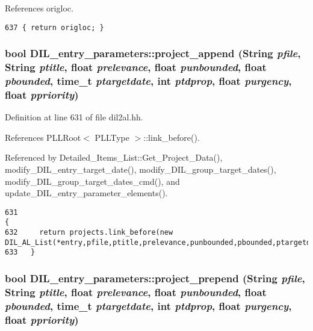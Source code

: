 References origloc.



\footnotesize\begin{verbatim}637 { return origloc; }
\end{verbatim}\normalsize 
{}
\subsubsection{\setlength{\rightskip}{0pt plus 5cm}bool DIL\_\-entry\_\-parameters::project\_\-append ({\bf String} {\em pfile}, {\bf String} {\em ptitle}, float {\em prelevance}, float {\em punbounded}, float {\em pbounded}, time\_\-t {\em ptargetdate}, int {\em ptdprop}, float {\em purgency}, float {\em ppriority})\hspace{0.3cm}{\tt  [inline]}}\label{classDIL__entry__parameters_a3}




Definition at line 631 of file dil2al.hh.

References PLLRoot$<$ PLLType $>$::link\_\-before().

Referenced by Detailed\_\-Items\_\-List::Get\_\-Project\_\-Data(), modify\_\-DIL\_\-entry\_\-target\_\-date(), modify\_\-DIL\_\-group\_\-target\_\-dates(), modify\_\-DIL\_\-group\_\-target\_\-dates\_\-cmd(), and update\_\-DIL\_\-entry\_\-parameter\_\-elements().



\footnotesize\begin{verbatim}631                                                                                                                                                                          {
632     return projects.link_before(new DIL_AL_List(*entry,pfile,ptitle,prelevance,punbounded,pbounded,ptargetdate,ptdprop,purgency,ppriority));
633   }
\end{verbatim}\normalsize 
{}
\subsubsection{\setlength{\rightskip}{0pt plus 5cm}bool DIL\_\-entry\_\-parameters::project\_\-prepend ({\bf String} {\em pfile}, {\bf String} {\em ptitle}, float {\em prelevance}, float {\em punbounded}, float {\em pbounded}, time\_\-t {\em ptargetdate}, int {\em ptdprop}, float {\em purgency}, float {\em ppriority})\hspace{0.3cm}{\tt  [inline]}}\label{classDIL__entry__parameters_a4}




